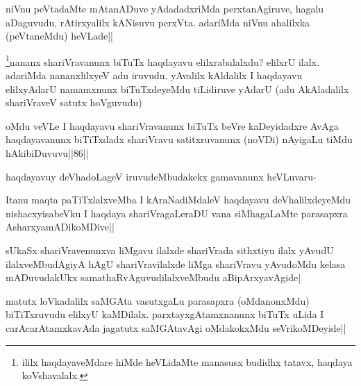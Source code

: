 \begin{artha}
niVnu peVtadaMte mAtanADuve yAdadadxriMda perxtanAgiruve, hagalu aDaguvudu, rAtirxyalilx kANisuvu perxVta. adariMda niVnu ahalilxka (peVtaneMdu) heVLade||
\end{artha}


\begin{artha}
\footnote[1]{ililx haqdayaveMdare hiMde heVLidaMte manasusx budidhx tatavx, haqdaya koVshavalalx.}nananx shariVravanunx biTuTx haqdayavu elilxrabalalxdu? elilxrU ilalx. adariMda nananxlilxyeV adu iruvudu. yAvalilx kAldalilx I haqdayavu elilxyAdarU namamxnunx biTuTxdeyeMdu tiLidiruve yAdarU (adu AkAladalilx shariVraveV satutx hoVguvudu)
\end{artha}


\begin{artha}
oMdu veVLe I haqdayavu shariVravanunx biTuTx beVre kaDeyidadxre AvAga haqdayavanunx biTiTxdadx shariVravu satitxruvanunx (noVDi) nAyigaLu tiMdu hAkibiDuvuvu||86||

haqdayavuy deVhadoLageV iruvudeMbudakekx gamavanunx heVLuvaru-
\end{artha}

\begin{artha}%
Itanu maqta paTiTxlalxveMba I kAraNadiMdaleV haqdayavu deVhalilxdeyeMdu nishacxyisabeVku I haqdaya shariVragaLeraDU vana siMhagaLaMte parasapxra AsharxyamADikoMDive||
\end{artha}


\begin{artha}
sUkaSx shariVravenunxva liMgavu ilalxde shariVrada sithxtiyu ilalx yAvudU ilalxveMbudAgiyA hAgU shariVravilalxde liMga shariVravu yAvudoMdu kelasa mADuvudakUkx samathaRvAguvudilalxveMbudu aBipArxyavAgide|
\end{artha}


\begin{artha}
matutx loVkadalilx saMGAta vasutxgaLu parasapxra (oMdanonxMdu) biTiTxruvudu elilxyU kaMDilalx. parxtayxgAtamxnanunx biTuTx uLida I carAcarAtamxkavAda jagatutx saMGAtavAgi oMdakokxMdu seVrikoMDeyide||
\end{artha}


